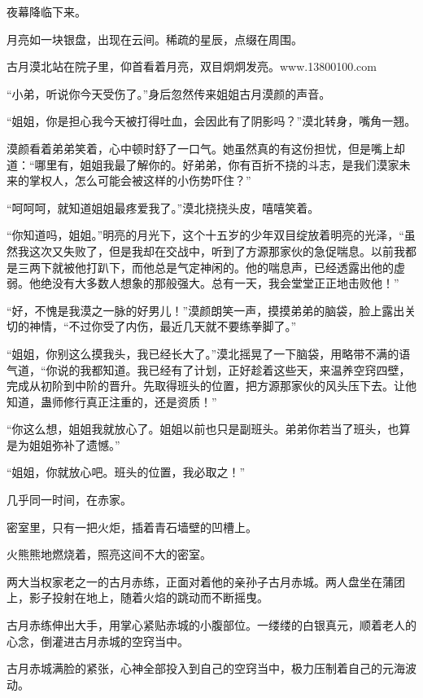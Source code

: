 
\begin{this_body}

夜幕降临下来。

月亮如一块银盘，出现在云间。稀疏的星辰，点缀在周围。

古月漠北站在院子里，仰首看着月亮，双目炯炯发亮。www.13800100.com

“小弟，听说你今天受伤了。”身后忽然传来姐姐古月漠颜的声音。

“姐姐，你是担心我今天被打得吐血，会因此有了阴影吗？”漠北转身，嘴角一翘。

漠颜看着弟弟笑着，心中顿时舒了一口气。她虽然真的有这份担忧，但是嘴上却道：“哪里有，姐姐我最了解你的。好弟弟，你有百折不挠的斗志，是我们漠家未来的掌权人，怎么可能会被这样的小伤势吓住？”

“呵呵呵，就知道姐姐最疼爱我了。”漠北挠挠头皮，嘻嘻笑着。

“你知道吗，姐姐。”明亮的月光下，这个十五岁的少年双目绽放着明亮的光泽，“虽然我这次又失败了，但是我却在交战中，听到了方源那家伙的急促喘息。以前我都是三两下就被他打趴下，而他总是气定神闲的。他的喘息声，已经透露出他的虚弱。他绝没有大多数人想象的那般强大。总有一天，我会堂堂正正地击败他！”

“好，不愧是我漠之一脉的好男儿！”漠颜朗笑一声，摸摸弟弟的脑袋，脸上露出关切的神情，“不过你受了内伤，最近几天就不要练拳脚了。”

“姐姐，你别这么摸我头，我已经长大了。”漠北摇晃了一下脑袋，用略带不满的语气道，“你说的我都知道。我已经有了计划，正好趁着这些天，来温养空窍四壁，完成从初阶到中阶的晋升。先取得班头的位置，把方源那家伙的风头压下去。让他知道，蛊师修行真正注重的，还是资质！”

“你这么想，姐姐我就放心了。姐姐以前也只是副班头。弟弟你若当了班头，也算是为姐姐弥补了遗憾。”

“姐姐，你就放心吧。班头的位置，我必取之！”

几乎同一时间，在赤家。

密室里，只有一把火炬，插着青石墙壁的凹槽上。

火熊熊地燃烧着，照亮这间不大的密室。

两大当权家老之一的古月赤练，正面对着他的亲孙子古月赤城。两人盘坐在蒲团上，影子投射在地上，随着火焰的跳动而不断摇曳。

古月赤练伸出大手，用掌心紧贴赤城的小腹部位。一缕缕的白银真元，顺着老人的心念，倒灌进古月赤城的空窍当中。

古月赤城满脸的紧张，心神全部投入到自己的空窍当中，极力压制着自己的元海波动。


\end{this_body}
